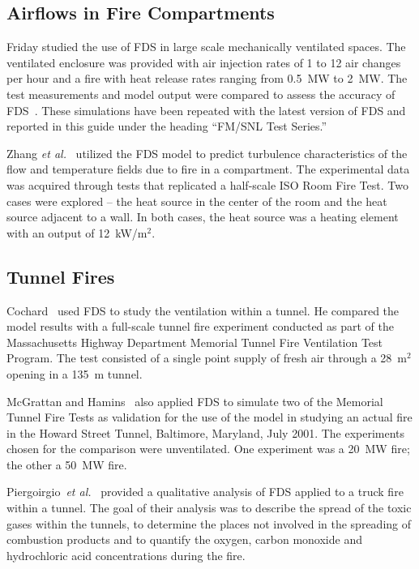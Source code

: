 \subsection{Airflows in Fire Compartments}

Friday studied the  use of FDS in large  scale mechanically ventilated spaces.   The ventilated  enclosure  was provided  with air  injection rates of  1 to 12 air  changes per hour  and a fire with  heat release rates ranging  from 0.5~MW to  2~MW.  The test measurements  and model output were compared to assess the accuracy of FDS~\cite{Friday:1}. These simulations have been repeated with the latest version of FDS and reported in this guide under
the heading ``FM/SNL Test Series.''

Zhang {\em  et al.}~\cite{Zhang:2} utilized  the FDS model  to predict turbulence characteristics  of the flow and temperature  fields due to fire in a compartment.   The experimental  data was  acquired through tests that replicated a half-scale ISO Room Fire Test.  Two cases were explored -- the heat  source in  the center  of the  room and  the heat source adjacent to a wall.  In both cases, the heat source was a heating element with an output of 12~kW/m$^2$.   


\subsection{Tunnel Fires}

Cochard~\cite{Cochard:1} used  FDS to  study the ventilation  within a tunnel. He  compared the model  results with a full-scale  tunnel fire
experiment conducted  as part of the  Massachusetts Highway Department Memorial Tunnel Fire Ventilation  Test Program.  The test consisted of a
single  point supply of  fresh air through  a 28~m$^2$ opening  in a 135~m tunnel.  

McGrattan and Hamins~\cite{McGrattan:HST} also applied FDS to simulate two of the Memorial Tunnel Fire Tests as validation for the use of the model
in  studying  an  actual  fire in  the  Howard  Street  Tunnel, Baltimore,  Maryland,  July  2001.  The  experiments  chosen  for  the comparison
were unventilated. One  experiment was  a 20~MW  fire; the other a 50~MW fire.  

Piergoirgio~{\em  et al.}~\cite{Piergiorgio:1} provided  a qualitative analysis of FDS applied to a  truck fire within a tunnel.  The goal of their
analysis  was to describe the  spread of the  toxic gases within the tunnels, to determine the  places not involved in the spreading of combustion
products  and to quantify  the oxygen, carbon  monoxide and hydrochloric acid concentrations during the fire.

